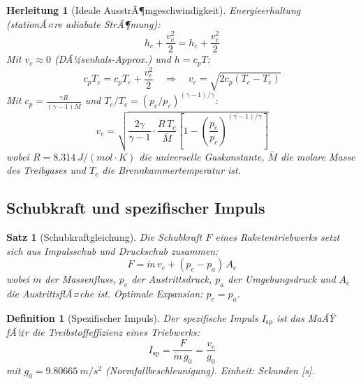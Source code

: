 ﻿\documentclass[12pt,a4paper]{article}
\newtheorem{satz}{Satz}[section]
\newtheorem{definition}{Definition}[section]
\newtheorem{herleitung}{Herleitung}[section]
\newcommand{\Isp}{I_{\mathrm{sp}}}
\newcommand{\ve}{v_e}
\newcommand{\mdot}{\dot{m}}
\begin{document}
\begin{herleitung}[Ideale AusstrÃ¶mgeschwindigkeit]
Energieerhaltung (stationÃ¤re adiabate StrÃ¶mung):
\[
  h_c + \frac{v_c^2}{2} = h_e + \frac{v_e^2}{2}
\]
Mit $v_c \approx 0$ (DÃ¼senhals-Approx.) und $h = c_p T$:
\[
  c_p T_c = c_p T_e + \frac{v_e^2}{2}
  \quad\Rightarrow\quad
  v_e = \sqrt{2 c_p (T_c - T_e)}
\]
Mit $c_p = \frac{\gamma R}{(\gamma-1)\bar{M}}$ und $T_e/T_c = (p_e/p_c)^{(\gamma-1)/\gamma}$:
\[
  \boxed{v_e = \sqrt{\frac{2\gamma}{\gamma-1}\cdot\frac{R\,T_c}{\bar{M}}
    \left[1 - \left(\frac{p_e}{p_c}\right)^{(\gamma-1)/\gamma}\right]}}
\]
wobei $R = \SI{8.314}{J/(mol\cdot K)}$ die universelle Gaskonstante,
$\bar{M}$ die molare Masse des Treibgases und $T_c$ die Brennkammertemperatur ist.
\end{herleitung}

\subsection{Schubkraft und spezifischer Impuls}

\begin{satz}[Schubkraftgleichung]
Die Schubkraft $F$ eines Raketentriebwerks setzt sich aus Impulsschub und Druckschub zusammen:
\[
  \boxed{F = \mdot\,\ve + (p_e - p_a)\,A_e}
\]
wobei $\mdot$ der Massenfluss, $p_e$ der Austrittsdruck, $p_a$ der Umgebungsdruck
und $A_e$ die AustrittsflÃ¤che ist. Optimale Expansion: $p_e = p_a$.
\end{satz}

\begin{definition}[Spezifischer Impuls]
Der spezifische Impuls $\Isp$ ist das MaÃŸ fÃ¼r die Treibstoffeffizienz eines Triebwerks:
\[
  \boxed{\Isp = \frac{F}{\mdot\,g_0} = \frac{\ve}{g_0}}
\]
mit $g_0 = \SI{9.80665}{m/s^2}$ (Normfallbeschleunigung). Einheit: Sekunden [s].
\end{definition}
\end{document}
